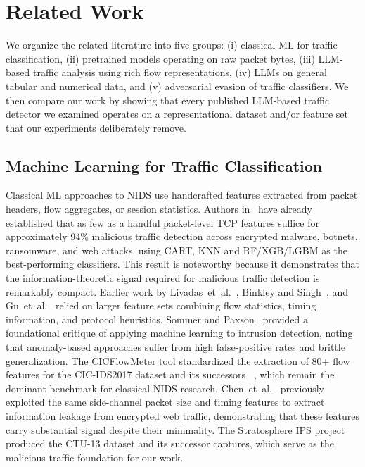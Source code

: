 \documentclass[letterpaper,twocolumn,10pt]{article}
\begin{document}
\section{Related Work}
\label{sec:related}

We organize the related literature into five groups: (i) classical ML for traffic classification, (ii) pretrained models operating on raw packet bytes, (iii) LLM-based traffic analysis using rich flow representations, (iv) LLMs on general tabular and numerical data, and (v) adversarial evasion of traffic classifiers. We then compare our work by showing that every published LLM-based traffic detector we examined operates on a representational dataset and/or feature set that our experiments deliberately remove.

\subsection{Machine Learning for Traffic Classification}

Classical ML approaches to NIDS use handcrafted features extracted from packet headers, flow aggregates, or session statistics. Authors in~\cite{stergiopoulos2018side, sharafaldin2018toward} have already established that as few as a handful packet-level TCP features suffice for approximately 94\% malicious traffic detection across encrypted malware, botnets, ransomware, and web attacks, using CART, KNN and RF/XGB/LGBM as the best-performing classifiers. This result is noteworthy because it demonstrates that the information-theoretic signal required for malicious traffic detection is remarkably compact. Earlier work by Livadas~et~al.~\cite{livadas2006botnet}, Binkley and Singh~\cite{binkley2006botnet}, and Gu~et~al.~\cite{gu2007bothunter} relied on larger feature sets combining flow statistics, timing information, and protocol heuristics. Sommer and Paxson~\cite{sommer2010outside} provided a foundational critique of applying machine learning to intrusion detection, noting that anomaly-based approaches suffer from high false-positive rates and brittle generalization. The CICFlowMeter tool standardized the extraction of 80+ flow features for the CIC-IDS2017 dataset and its successors ~\cite{Arash2017,sharafaldin2018toward}, which remain the dominant benchmark for classical NIDS research. Chen~et~al.~\cite{chen2010sidechannel} previously exploited the same side-channel packet size and timing features to extract information leakage from encrypted web traffic, demonstrating that these features carry substantial signal despite their minimality. The Stratosphere IPS project~\cite{garcia2014ctu13} produced the CTU-13 dataset and its successor captures, which serve as the malicious traffic foundation for our work.
\end{document}
